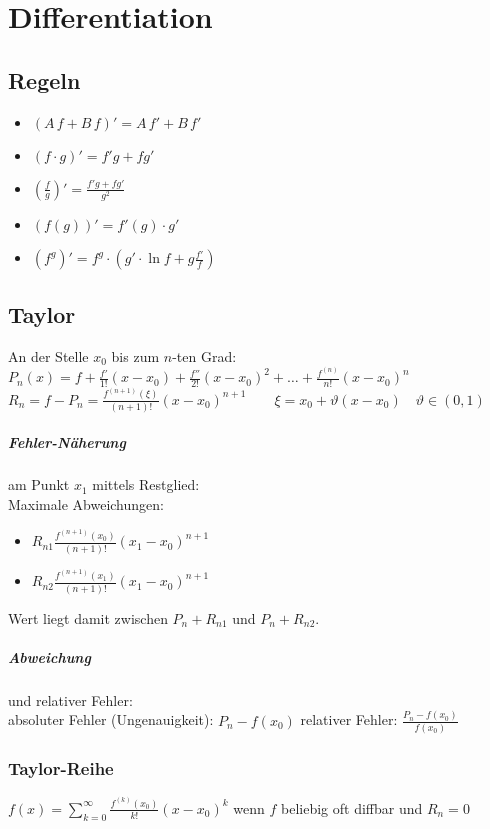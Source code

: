 \documentclass{scrreprt}
\begin{document}
\chapter{Differentiation}

\section{Regeln}
\begin{itemize}
\item $(A\,f+B\,f)' = A\,f'+B\,f'$
\item $(f\cdot g)' = f'g+fg'$
\item $\left(\frac{f}{g}\right)'=\frac{f'g+fg'}{g^2}$
\item $(f(g))'=f'(g)\cdot g'$
\item $(f^g)'=f^g\cdot \left(g'\cdot \ln f + g\frac{f'}{f}\right)$
\end{itemize}

\section{Taylor}
An der Stelle $x_0$ bis zum $n$-ten Grad:\\
$P_n(x)=f+\frac{f'}{1!}(x-x_0)+\frac{f''}{2!}(x-x_0)^2+\dots + \frac{f^{(n)}}{n!}(x-x_0)^n$\\
$R_n=f-P_n=\frac{f^{(n+1)}(\xi)}{(n+1)!}(x-x_0)^{n+1} \qquad \xi=x_0+\vartheta(x-x_0)\quad \vartheta \in (0,1)$

\paragraph{Fehler-Näherung} am Punkt $x_1$ mittels Restglied:\\
Maximale Abweichungen:
\begin{itemize}
\item $R_{n1}\frac{f^{(n+1)}(x_0)}{(n+1)!}(x_1-x_0)^{n+1}$
\item $R_{n2}\frac{f^{(n+1)}(x_1)}{(n+1)!}(x_1-x_0)^{n+1}$
\end{itemize}
Wert liegt damit zwischen $P_n+R_{n1}$ und $P_n+R_{n2}$.
\paragraph{Abweichung} und relativer Fehler:\\
absoluter Fehler (Ungenauigkeit): $P_n-f(x_0)$
relativer Fehler: $\frac{P_n-f(x_0)}{f(x_0)}$

\subsection{Taylor-Reihe}
$f(x)=\sum_{k=0}^\infty \frac{f^{(k)}(x_0)}{k!}(x-x_0)^k$ wenn $f$ beliebig oft diffbar und $R_n=0$
\end{document}
